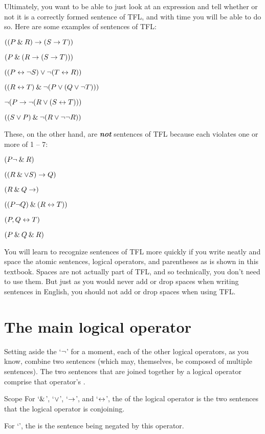 Ultimately, you want to be able to just look at an expression and tell whether or not it is a correctly formed sentence of TFL, and with time you will be able to do so. Here are some examples of sentences of TFL:
\begin{earg}
\item $((P \mathbin{\&} R) \rightarrow (S \rightarrow T))$
\item $(P \mathbin{\&} (R \rightarrow (S \rightarrow T)))$
\item $((P \leftrightarrow {\neg} S) \vee {\neg}(T \leftrightarrow R))$
\item $((R \leftrightarrow T) \mathbin{\&} {\neg}(P \vee (Q \vee {\neg} T)))$
\item ${\neg}(P \rightarrow {\neg}(R \vee (S \leftrightarrow T)))$
\item $((S \vee P) \mathbin{\&} {\neg}(R \vee {\neg}{\neg} R))$
\end{earg}
These, on the other hand, are \textit{\textbf{not}} sentences of TFL because each violates one or more of 1 -- 7:
\begin{earg}
\item $(P{\neg} \mathbin{\&} R)$
\item $((R \mathbin{\&} \vee S) \rightarrow Q)$
\item $(R \mathbin{\&} Q \rightarrow)$
\item $((P {\neg} Q) \mathbin{\&} (R \leftrightarrow T))$
\item $(P,Q \leftrightarrow T)$
\item $(P \mathbin{\&} Q \mathbin{\&} R)$
\end{earg}

You will learn to recognize sentences of TFL more quickly if you write neatly and space the atomic sentences, logical operators, and parentheses as is shown in this textbook. Spaces are not actually part of TFL, and so technically, you don't need to use them. But just as you would never add or drop spaces when writing sentences in English, you should not add or drop spaces when using TFL.


\section{The main logical operator}
\label{main_logical_operator}

Setting aside the `${\neg}$' for a moment, each of the other logical operators, as you know, combine two sentences (which may, themselves, be composed of multiple sentences). The two sentences that are joined together by a logical operator comprise that operator's . 

\begin{factboxy}{Scope}
For `$\mathbin{\&}$', `$\vee$', `$\rightarrow$', and `$\leftrightarrow$', the  of the logical operator is the two sentences that the logical operator is conjoining. 
\smallskip

For `\enot', the  is the sentence being negated by this operator.
\end{factboxy}

